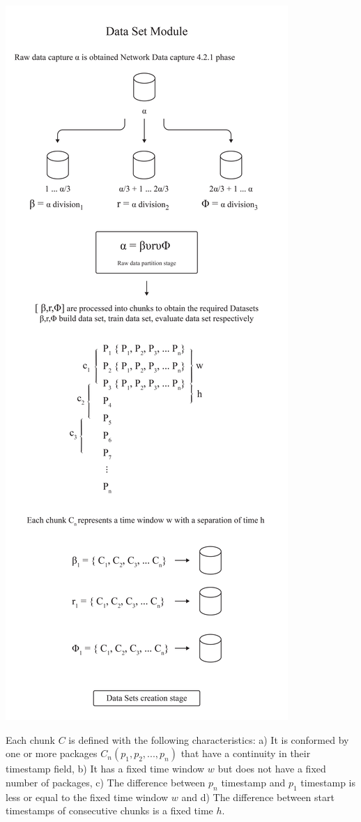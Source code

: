 \documentclass{article}
\begin{document}
	\begin{center}\includegraphics[scale=0.2]{fig-three} \end{center}
	
Each chunk $C$ is defined with the following characteristics: a) It is conformed by one or more packages $C_n(p_1, p_2,...,p_n)$ that have a continuity in their timestamp field, b) It has a fixed time window $w$ but does not have a fixed number of packages, c) The difference between $p_n$ timestamp and $p_1$ timestamp is less or equal to the fixed time window $w$ and d) The difference between start timestamps of consecutive chunks is a fixed time $h$.
\end{document}
